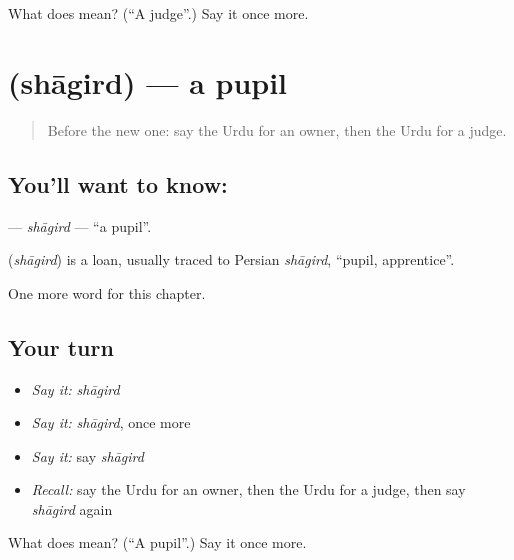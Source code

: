 \begin{tcolorbox}[breakable,colback=teal!4,colframe=teal!35!black,title={Before you move on}]
What does  mean? (\textquotedblleft{}A judge\textquotedblright{}.) Say it once more.
\end{tcolorbox}
\section[\texorpdfstring{\ur{شاگرد} (shāgird)}{شاگرد (shāgird)}]{ (shāgird) — a pupil}

\label{lesson:UR-C262-shagird}



\begin{quote}
Before the new one: say the Urdu for an owner, then the Urdu for a judge.
\end{quote}

\subsection*{You'll want to know: }
\textbf{} — \emph{shāgird} — \textquotedblleft{}a pupil\textquotedblright{}.

\begin{cousinweb}
\textbf{} (\emph{shāgird}) is a loan, usually traced to Persian \emph{shāgird}, \textquotedblleft{}pupil, apprentice\textquotedblright{}.
\end{cousinweb}

\begin{grammarlens}[title={What you've built}]
One more word for this chapter.
\end{grammarlens}

\subsection*{Your turn}
\begin{itemize}
\raggedright
  \item \emph{Say it:} \emph{shāgird}
  \item \emph{Say it:} \emph{shāgird}, once more
  \item \emph{Say it:} say \emph{shāgird}
  \item \emph{Recall:} say the Urdu for an owner, then the Urdu for a judge, then say \emph{shāgird} again
\end{itemize}

\begin{tcolorbox}[breakable,colback=teal!4,colframe=teal!35!black,title={Before you move on}]
What does  mean? (\textquotedblleft{}A pupil\textquotedblright{}.) Say it once more.
\end{tcolorbox}
